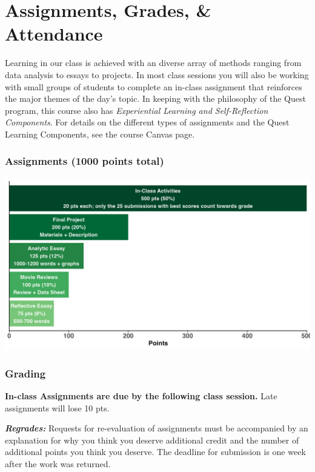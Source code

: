\documentclass[
  10pt,
  letterpaper,
  oneside,
  open=any]{scrbook}
\begin{document}

\chapter{Assignments, Grades, \&
Attendance}\label{assignments-grades-attendance}

Learning in our class is achieved with an diverse array of methods
ranging from data analysis to essays to projects. In most class sessions
you will also be working with small groups of students to complete an
in-class assignment that reinforces the major themes of the day's topic.
In keeping with the philosophy of the Quest program, this course also
has \emph{Experiential Learning and Self-Reflection Components}. For
details on the different types of assignments and the Quest Learning
Components, see the course Canvas page.

\subsection{Assignments (1000 points
total)}\label{assignments-1000-points-total}

\begin{center}
\includegraphics[width=1\textwidth,height=\textheight]{images/hw.png}
\end{center}

\subsection{Grading}\label{grading}

\textbf{In-class Assignments are due by the following class session.}
Late assignments will lose 10 pts.

\textbf{\emph{Regrades:}} Requests for re-evaluation of assignments must
be accompanied by an explanation for why you think you deserve
additional credit and the number of additional points you think you
deserve. The deadline for submission is one week after the work was
returned.
\end{document}
